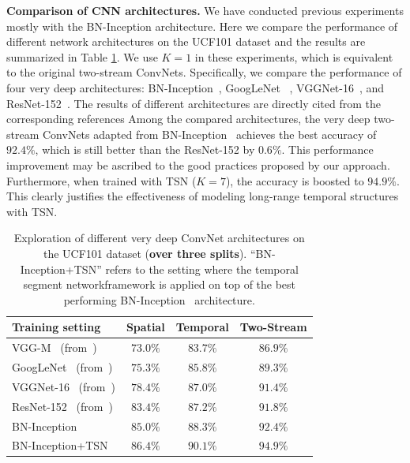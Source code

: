 \documentclass[10pt,journal,compsoc]{IEEEtran}
\newcommand{\SEGNET}{temporal segment network}
\begin{document}
{\bf Comparison of CNN architectures.}
We have conducted previous experiments mostly with the BN-Inception architecture. Here we compare the performance of different network architectures on the UCF101 dataset and the results are summarized in Table \ref{tbl:structure}. 
We use $ K=1 $ in these experiments, which is equivalent to the original two-stream ConvNets. Specifically, we compare the performance of four very deep architectures: BN-Inception~\cite{IoffeS15}, GoogLeNet~ \cite{SzegedyLJSRAEVR14}, VGGNet-16~\cite{SimonyanZ14a}, and ResNet-152~\cite{HeZRS15}. The results of different architectures are directly cited from the corresponding references
Among the compared architectures, the very deep two-stream ConvNets adapted from BN-Inception~\cite{IoffeS15} achieves the best accuracy of $92.4\%$, which is still better than the ResNet-152 by $0.6\%$. This performance improvement may be ascribed to the good practices proposed by our approach.
Furthermore, when trained with TSN ($ K=7 $), the accuracy is boosted to $ 94.9\% $. This clearly justifies the effectiveness of modeling long-range temporal structures with TSN.

\begin{table}[t]
  \begin{center}
    \caption{Exploration of different very deep ConvNet architectures on the UCF101 dataset ({\bf over three splits}). 
      ``BN-Inception+TSN'' refers to the setting where the \SEGNET framework is applied on top of the best performing BN-Inception~\cite{IoffeS15} architecture.}
    \label{tbl:structure}
    \vspace{-10pt}
    \begin{tabular}{|l|c|c|c|}
      \hline
      Training setting & Spatial  & Temporal  & Two-Stream \\
      \hline 
      VGG-M~\cite{ChatfieldSVZ14} (from~\cite{SimonyanZ14}) & $ 73.0\% $ & $ 83.7\% $ & $ 86.9\% $ \\
      \hline
      GoogLeNet~\cite{SzegedyLJSRAEVR14} (from~\cite{WangXW015})  & $ 75.3\% $ &  $ 85.8\% $ & $ 89.3\% $ \\
      \hline
      VGGNet-16~\cite{SimonyanZ14a} (from~\cite{WangXW015}) & $ 78.4\% $ &  $ 87.0\% $ & $ 91.4\% $ \\
      \hline
      ResNet-152~\cite{HeZRS15} (from~\cite{FeichtenhoferPW16}) & $83.4\%$ & $87.2\%$ & $91.8\%$ \\
      \hline
      BN-Inception~\cite{IoffeS15} & $ 85.0\% $  & $ 88.3\% $ & $ 92.4\% $ \\
      \hline
      \hline
      BN-Inception+TSN  & $ 86.4 \%$ & $ 90.1 \%$ & $ \mathbf{94.9\%} $ \\
      \hline
    \end{tabular}
  \end{center}
  \vspace{-10pt}
\end{table}
\end{document}
